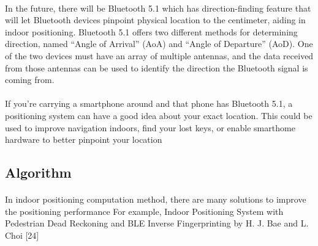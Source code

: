 \paragraph{}In the future, there will be Bluetooth 5.1 which has direction-finding feature that will let Bluetooth devices pinpoint physical location to the centimeter, aiding in indoor positioning. Bluetooth 5.1 offers two different methods for determining direction, named “Angle of Arrival” (AoA) and “Angle of Departure” (AoD). One of the two devices must have an array of multiple antennas, and the data received from those antennas can be used to identify the direction the Bluetooth signal is coming from.
\paragraph{}If you’re carrying a smartphone around and that phone has Bluetooth 5.1, a positioning system can have a good idea about your exact location. This could be used to improve navigation indoors, find your lost keys, or enable smarthome hardware to better pinpoint your location
\subsection{Algorithm}
\paragraph{}In indoor positioning computation method, there are many solutions to improve the positioning performance For example, Indoor Positioning System with Pedestrian Dead Reckoning and BLE Inverse Fingerprinting by H. J. Bae and L. Choi [24]